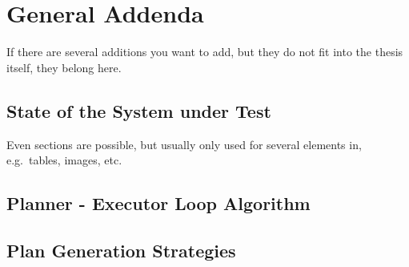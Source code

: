\chapter{General Addenda}

If there are several additions you want to add, but they do not fit into the thesis itself, they belong here.

\section{State of the System under Test}

\label{car-state-appendix}

Even sections are possible, but usually only used for several elements in, e.g.\ tables, images, etc.

\section{Planner - Executor Loop Algorithm}

\section{Plan Generation Strategies}

